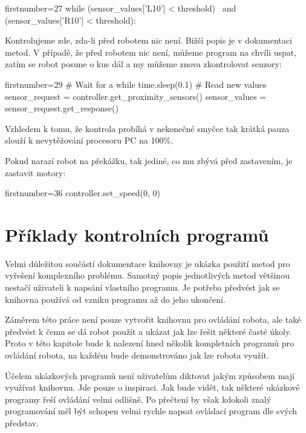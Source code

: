 \documentclass[12pt,notitlepage]{report}
\begin{document}
    \begin{pyc*}{firstnumber=27}
while (sensor_values['L10'] < threshold) \
       and (sensor_values['R10'] < threshold):
    \end{pyc*}

    Kontrolujeme zde, zda-li  před robotem nic není. Bižší popis je v
    dokumentaci metod. V případě, že před robotem nic není, můžeme program na
    chvíli uspat, zatím se robot posune o kus dál a my můžeme znova
    zkontrolovat senzory:

    \begin{pyc*}{firstnumber=29}
    # Wait for a while
    time.sleep(0.1)
    # Read new values
    sensor_request = controller.get_proximity_sensors()
    sensor_values = sensor_request.get_response()
    \end{pyc*}

    Vzhledem k tomu, že kontrola probíhá v nekonečné smyčce tak krátká pauza
    slouží k nevytěžování procesoru PC na 100\%.

    Pokud narazí robot na překážku, tak jediné, co mu zbývá před zastavením, je
    zastavit motory:

    \begin{pyc*}{firstnumber=36}
    controller.set_speed(0, 0)
    \end{pyc*}

\chapter{Příklady kontrolních programů} %
\label{priklady}

Velmi důležitou součástí dokumentace knihovny je ukázka použití metod pro
vyřešení komplexního problému. Samotný popis jednotlivých metod většinou
nestačí uživateli k napsání vlastního programu. Je potřeba předvést jak se
knihovna používá od vzniku programu až do jeho ukončení.

Záměrem této práce není pouze vytvořit knihovnu pro ovládání robota, ale také
předvést k čemu se dá robot použít a ukázat jak lze řešit některé časté úkoly.
Proto v této kapitole bude k nalezení hned několik kompletních programů pro
ovládání robota, na každém bude demonstrováno jak lze robota využít.

Účelem ukázkových programů není uživatelům diktovat jakým způsobem mají
využívat knihovnu. Jde pouze o inspiraci. Jak bude vidět, tak některé ukázkové
programy řeší ovládání velmi odlišně. Po přečtení by však kdokoli znalý
programování měl být schopen velmi rychle napsat ovládací program dle svých
představ.
\end{document}
